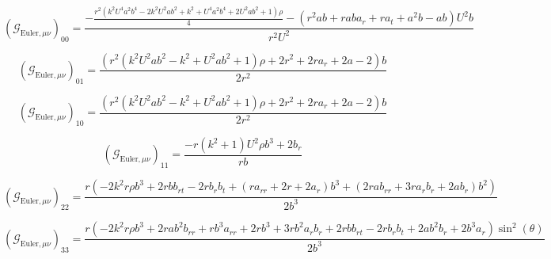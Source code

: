 $$\left(\mathcal{G}_{\mathrm{Euler},\mu\nu}\right)_{00} = \frac{- \frac{r^{2} \left(k^{2} U^{4} a^{2} b^{4} - 2 k^{2} U^{2} a b^{2} + k^{2} + U^{4} a^{2} b^{4} + 2 U^{2} a b^{2} + 1\right) \rho}{4} - \left(r^{2} a b + r a b a_{r} + r a_{t} + a^{2} b - a b\right) U^{2} b}{r^{2} U^{2}}$$

$$\left(\mathcal{G}_{\mathrm{Euler},\mu\nu}\right)_{01} = \frac{\left(r^{2} \left(k^{2} U^{2} a b^{2} - k^{2} + U^{2} a b^{2} + 1\right) \rho + 2 r^{2} + 2 r a_{r} + 2 a - 2\right) b}{2 r^{2}}$$

$$\left(\mathcal{G}_{\mathrm{Euler},\mu\nu}\right)_{10} = \frac{\left(r^{2} \left(k^{2} U^{2} a b^{2} - k^{2} + U^{2} a b^{2} + 1\right) \rho + 2 r^{2} + 2 r a_{r} + 2 a - 2\right) b}{2 r^{2}}$$

$$\left(\mathcal{G}_{\mathrm{Euler},\mu\nu}\right)_{11} = \frac{- r \left(k^{2} + 1\right) U^{2} \rho b^{3} + 2 b_{r}}{r b}$$

$$\left(\mathcal{G}_{\mathrm{Euler},\mu\nu}\right)_{22} = \frac{r \left(- 2 k^{2} r \rho b^{3} + 2 r b b_{rt} - 2 r b_{r} b_{t} + \left(r a_{rr} + 2 r + 2 a_{r}\right) b^{3} + \left(2 r a b_{rr} + 3 r a_{r} b_{r} + 2 a b_{r}\right) b^{2}\right)}{2 b^{3}}$$

$$\left(\mathcal{G}_{\mathrm{Euler},\mu\nu}\right)_{33} = \frac{r \left(- 2 k^{2} r \rho b^{3} + 2 r a b^{2} b_{rr} + r b^{3} a_{rr} + 2 r b^{3} + 3 r b^{2} a_{r} b_{r} + 2 r b b_{rt} - 2 r b_{r} b_{t} + 2 a b^{2} b_{r} + 2 b^{3} a_{r}\right) \sin^{2}{\left(\theta \right)}}{2 b^{3}}$$

